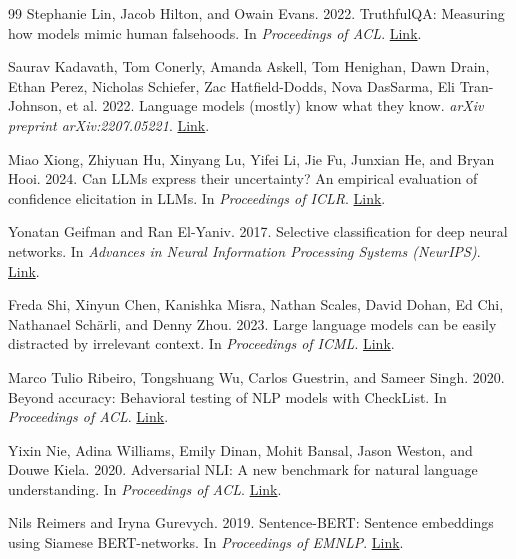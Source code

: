 \documentclass[11pt]{article}
\begin{document}
\begin{thebibliography}{99}
Stephanie Lin, Jacob Hilton, and Owain Evans. 2022.
\newblock TruthfulQA: Measuring how models mimic human falsehoods.
\newblock In \emph{Proceedings of ACL}.
\newblock \href{https://aclanthology.org/2022.acl-long.229/}{Link}.

Saurav Kadavath, Tom Conerly, Amanda Askell, Tom Henighan, Dawn Drain, Ethan Perez,
Nicholas Schiefer, Zac Hatfield-Dodds, Nova DasSarma, Eli Tran-Johnson, et al. 2022.
\newblock Language models (mostly) know what they know.
\newblock \emph{arXiv preprint arXiv:2207.05221}.
\newblock \href{https://arxiv.org/abs/2207.05221}{Link}.

Miao Xiong, Zhiyuan Hu, Xinyang Lu, Yifei Li, Jie Fu, Junxian He, and Bryan Hooi. 2024.
\newblock Can LLMs express their uncertainty? An empirical evaluation of confidence
elicitation in LLMs.
\newblock In \emph{Proceedings of ICLR}.
\newblock \href{https://arxiv.org/abs/2306.13063}{Link}.

Yonatan Geifman and Ran El-Yaniv. 2017.
\newblock Selective classification for deep neural networks.
\newblock In \emph{Advances in Neural Information Processing Systems (NeurIPS)}.
\newblock \href{https://arxiv.org/abs/1705.08500}{Link}.

Freda Shi, Xinyun Chen, Kanishka Misra, Nathan Scales, David Dohan, Ed Chi,
Nathanael Sch\"{a}rli, and Denny Zhou. 2023.
\newblock Large language models can be easily distracted by irrelevant context.
\newblock In \emph{Proceedings of ICML}.
\newblock \href{https://proceedings.mlr.press/v202/shi23a.html}{Link}.

Marco Tulio Ribeiro, Tongshuang Wu, Carlos Guestrin, and Sameer Singh. 2020.
\newblock Beyond accuracy: Behavioral testing of NLP models with CheckList.
\newblock In \emph{Proceedings of ACL}.
\newblock \href{https://aclanthology.org/2020.acl-main.442/}{Link}.

Yixin Nie, Adina Williams, Emily Dinan, Mohit Bansal, Jason Weston, and Douwe Kiela. 2020.
\newblock Adversarial NLI: A new benchmark for natural language understanding.
\newblock In \emph{Proceedings of ACL}.
\newblock \href{https://aclanthology.org/2020.acl-main.441/}{Link}.

Nils Reimers and Iryna Gurevych. 2019.
\newblock Sentence-BERT: Sentence embeddings using Siamese BERT-networks.
\newblock In \emph{Proceedings of EMNLP}.
\newblock \href{https://aclanthology.org/D19-1410/}{Link}.


\end{thebibliography}
\end{document}
